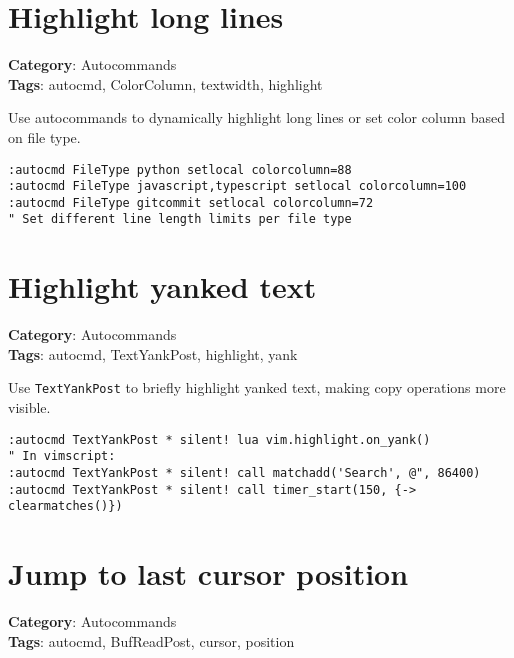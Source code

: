 {\section{Highlight long lines}

\textbf{Category}: Autocommands\\ \textbf{Tags}: autocmd, ColorColumn, textwidth, highlight
\vspace{0.5cm}

Use autocommands to dynamically highlight long lines or set color column based on file type.

\begin{Exa*}{}
\begin{Verbatim}[fontsize=\footnotesize, breaklines, breakanywhere]
:autocmd FileType python setlocal colorcolumn=88
:autocmd FileType javascript,typescript setlocal colorcolumn=100
:autocmd FileType gitcommit setlocal colorcolumn=72
" Set different line length limits per file type
\end{Verbatim}
\end{Exa*}

\section{Highlight yanked text}

\textbf{Category}: Autocommands\\ \textbf{Tags}: autocmd, TextYankPost, highlight, yank
\vspace{0.5cm}

Use {\footnotesize \Verb§TextYankPost§} to briefly highlight yanked text, making copy operations more visible.

\begin{Exa*}{}
\begin{Verbatim}[fontsize=\footnotesize, breaklines, breakanywhere]
:autocmd TextYankPost * silent! lua vim.highlight.on_yank()
" In vimscript: 
:autocmd TextYankPost * silent! call matchadd('Search', @", 86400)
:autocmd TextYankPost * silent! call timer_start(150, {-> clearmatches()})
\end{Verbatim}
\end{Exa*}

\section{Jump to last cursor position}

\textbf{Category}: Autocommands\\ \textbf{Tags}: autocmd, BufReadPost, cursor, position
\vspace{0.5cm}

}
